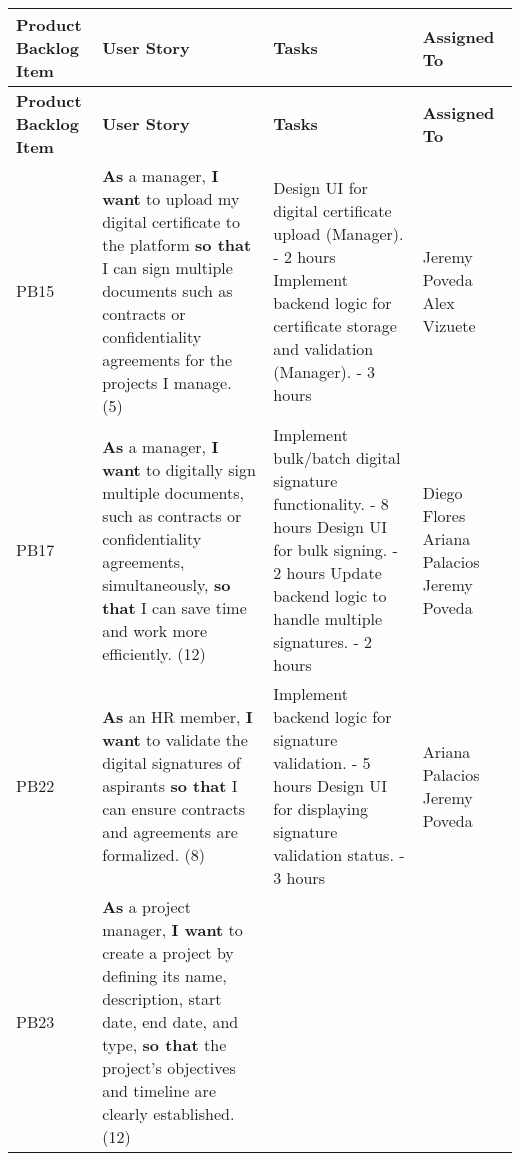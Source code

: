 \documentclass{scrreprt}
\begin{document}
\begin{longtable}{|p{1.5cm}|p{5.5cm}|p{4.5cm}|p{3cm}|} \hline
	\textbf{Product Backlog Item} & \textbf{User Story} & \textbf{Tasks} & \textbf{Assigned To} \\ \hline
	\endfirsthead
	\hline
	\textbf{Product Backlog Item} & \textbf{User Story} & \textbf{Tasks} & \textbf{Assigned To} \\ \hline
	\endhead
	
	PB15 & \textbf{As} a manager, \textbf{I want} to upload my digital certificate to the platform \textbf{so that} I can sign multiple documents such as contracts or confidentiality agreements for the projects I manage. (5) &
	
	Design UI for digital certificate upload (Manager). - 2 hours \newline
	Implement backend logic for certificate storage and validation (Manager). - 3 hours &
	Jeremy Poveda \newline
	Alex Vizuete \\ \hline
	
	PB17 & \textbf{As} a manager, \textbf{I want} to digitally sign multiple documents, such as contracts or confidentiality agreements, simultaneously, \textbf{so that} I can save time and work more efficiently. (12) &
	
	Implement bulk/batch digital signature functionality. - 8 hours \newline
	Design UI for bulk signing. - 2 hours \newline
	Update backend logic to handle multiple signatures. - 2 hours &
	Diego Flores \newline
	Ariana Palacios \newline
	Jeremy Poveda \\ \hline
	
	PB22 & \textbf{As} an HR member, \textbf{I want} to validate the digital signatures of aspirants \textbf{so that} I can ensure contracts and agreements are formalized. (8) &
	
	Implement backend logic for signature validation. - 5 hours \newline
	Design UI for displaying signature validation status. - 3 hours &
	Ariana Palacios \newline
	Jeremy Poveda \\ \hline
	
	PB23 & \textbf{As} a project manager, \textbf{I want} to create a project by defining its name, description, start date, end date, and type, \textbf{so that} the project's objectives and timeline are clearly established. (12) &
	

\end{longtable}
\end{document}
